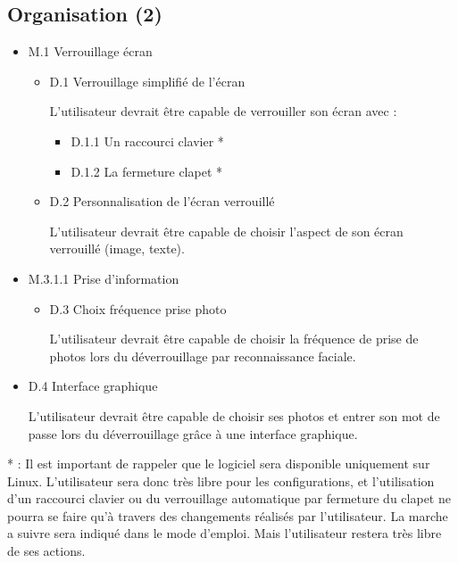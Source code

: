   \subsection{Organisation (2)}
  \begin{itemize}
  \item{M.1 Verrouillage écran}
    \begin{itemize}
    \item{D.1 Verrouillage simplifié de l’écran}

    L’utilisateur devrait être capable de verrouiller son écran avec :
      \begin{itemize}
      \item{D.1.1 Un raccourci clavier *}
      \item{D.1.2 La fermeture clapet *}
      \\
      \end{itemize}
      \item{D.2 Personnalisation de l’écran verrouillé}

      L’utilisateur devrait être capable de choisir l’aspect 	de son écran
      verrouillé (image, texte).
      \\
    \end{itemize}
    \item{M.3.1.1 Prise d’information}
    \begin{itemize}
      \item{D.3 Choix fréquence prise photo}

      L’utilisateur devrait être capable de choisir la 	fréquence de prise de
      photos lors du déverrouillage par reconnaissance faciale.
      \\
    \end{itemize}
    \item{D.4 Interface graphique}

    L’utilisateur devrait être capable de choisir ses photos et entrer son mot
    de passe lors du déverrouillage grâce à une interface graphique.
  \end{itemize}
\vspace{0.5cm}

* : Il est important de rappeler que le logiciel sera disponible uniquement sur
Linux. L'utilisateur sera donc très libre pour les configurations, et l'utilisation
d'un raccourci clavier ou du verrouillage automatique par fermeture du clapet
ne pourra se faire qu'à travers des changements réalisés par l'utilisateur. La
marche a suivre sera indiqué dans le mode d'emploi. Mais l'utilisateur restera
très libre de ses actions.

